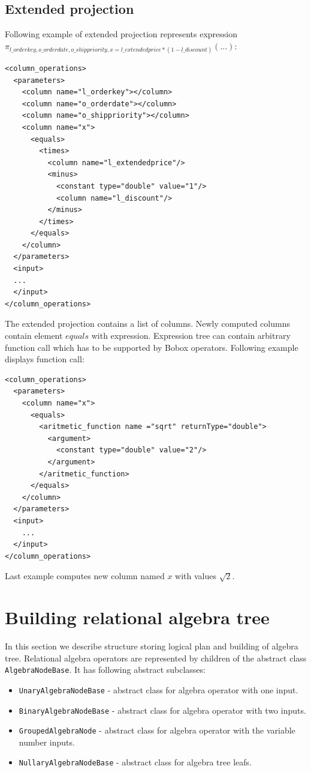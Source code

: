 \subsection{Extended projection}
Following example of extended projection represents expression \\ $\pi_{l\_orderkey,o\_orderdate,o\_shippriority,x=l\_extendedprice*(1-l\_discount)}(...)$:
\begin{lstlisting}
<column_operations>
  <parameters>
    <column name="l_orderkey"></column>
    <column name="o_orderdate"></column>
    <column name="o_shippriority"></column>
    <column name="x">
      <equals>
        <times>
          <column name="l_extendedprice"/>
          <minus>
            <constant type="double" value="1"/>
            <column name="l_discount"/>
          </minus>
        </times>
      </equals>
    </column>
  </parameters>
  <input>
  ...
  </input>
</column_operations>
\end{lstlisting}

The extended projection contains a list of columns. Newly computed columns contain element $equals$ with expression. Expression tree can contain arbitrary function call which has to be supported by Bobox operators. Following example displays function call:


\begin{lstlisting}
<column_operations>
  <parameters>
    <column name="x">
      <equals>
        <aritmetic_function name ="sqrt" returnType="double">
          <argument>
            <constant type="double" value="2"/>
          </argument>
        </aritmetic_function>
      </equals>
    </column>
  </parameters>
  <input>
    ...
  </input>
</column_operations>
\end{lstlisting}
 
Last example computes new column named $x$ with values $\sqrt{2}$.
 
\section{Building relational algebra tree} 

In this section we describe structure storing logical plan and building of algebra tree. Relational algebra operators are represented by children of the abstract class \texttt{AlgebraNodeBase}. It has following abstract subclasses:
\begin{itemize}

\item \texttt{UnaryAlgebraNodeBase} - abstract class for algebra operator with one input.

\item \texttt{BinaryAlgebraNodeBase}  - abstract class for algebra operator with two inputs.

\item \texttt{GroupedAlgebraNode} - abstract class for algebra operator with the variable number inputs.

\item \texttt{NullaryAlgebraNodeBase} -  abstract class for algebra tree leafs.

\end{itemize}

